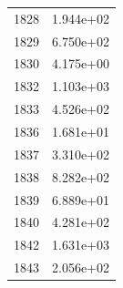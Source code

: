 \documentclass[12pt]{article}
\begin{document}
\begin{longtable}{@{}cc@{}}
1828 & 1.944e+02 \\
1829 & 6.750e+02 \\
1830 & 4.175e+00 \\
1832 & 1.103e+03 \\
1833 & 4.526e+02 \\
1836 & 1.681e+01 \\
1837 & 3.310e+02 \\
1838 & 8.282e+02 \\
1839 & 6.889e+01 \\
1840 & 4.281e+02 \\
1842 & 1.631e+03 \\
1843 & 2.056e+02 \\

\bottomrule
\end{longtable}
\end{document}
